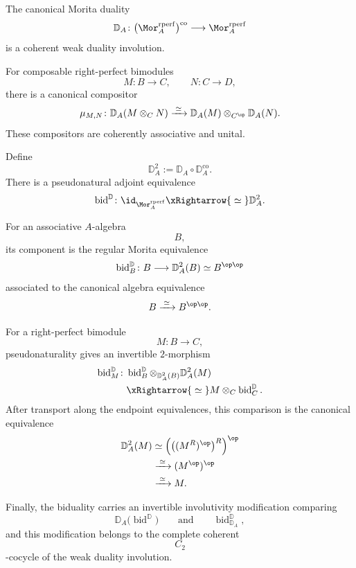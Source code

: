 \begin{theorem}
\label{thm:weak-morita-duality-involution}
The canonical Morita duality
\[
    \mathbb D_A
    \colon
    \bigl(
        \Mor_A^{\mathrm{rperf}}
    \bigr)^{\mathrm{co}}
    \longrightarrow
    \Mor_A^{\mathrm{rperf}}
\]
is a coherent weak duality involution.

For composable right-perfect bimodules
\[
    M
    \colon
    B
    \longrightarrow
    C,
    \qquad
    N
    \colon
    C
    \longrightarrow
    D,
\]
there is a canonical compositor
\[
    \mu_{M,N}
    \colon
    \mathbb D_A(M\otimes_C N)
    \xrightarrow{\;\simeq\;}
    \mathbb D_A(M)
    \otimes_{C^{\op}}
    \mathbb D_A(N).
\]
These compositors are coherently associative and unital.

Define
\[
    \mathbb D_A^2
    :=
    \mathbb D_A
    \circ
    \mathbb D_A^{\mathrm{co}}.
\]
There is a pseudonatural adjoint equivalence
\[
    \operatorname{bid}^{\mathbb D}
    \colon
    \id_{\Mor_A^{\mathrm{rperf}}}
    \xRightarrow{\;\simeq\;}
    \mathbb D_A^2.
\]

For an associative $A$-algebra
\[
    B,
\]
its component is the regular Morita equivalence
\[
    \operatorname{bid}^{\mathbb D}_B
    \colon
    B
    \longrightarrow
    \mathbb D_A^2(B)
    \simeq
    B^{\op\op}
\]
associated to the canonical algebra equivalence
\[
    B
    \xrightarrow{\;\simeq\;}
    B^{\op\op}.
\]

For a right-perfect bimodule
\[
    M
    \colon
    B
    \longrightarrow
    C,
\]
pseudonaturality gives an invertible $2$-morphism
\[
\begin{aligned}
    \operatorname{bid}^{\mathbb D}_M
    \colon{}&
    \operatorname{bid}^{\mathbb D}_B
    \otimes_{\mathbb D_A^2(B)}
    \mathbb D_A^2(M)
    \\
    &\xRightarrow{\;\simeq\;}
    M
    \otimes_C
    \operatorname{bid}^{\mathbb D}_C.
\end{aligned}
\]
After transport along the endpoint equivalences, this comparison is the
canonical equivalence
\[
\begin{aligned}
    \mathbb D_A^2(M)
    &\simeq
    \left(
        \bigl((M^R)^{\op}\bigr)^R
    \right)^{\op}
    \\
    &\xrightarrow{\;\simeq\;}
    (M^{\op})^{\op}
    \\
    &\xrightarrow{\;\simeq\;}
    M.
\end{aligned}
\]

Finally, the biduality carries an invertible involutivity modification
comparing
\[
    \mathbb D_A
    \bigl(
        \operatorname{bid}^{\mathbb D}
    \bigr)
    \qquad\text{and}\qquad
    \operatorname{bid}^{\mathbb D}_{\mathbb D_A},
\]
and this modification belongs to the complete coherent
\[
    C_2
\]
-cocycle of the weak duality involution.
\end{theorem}

